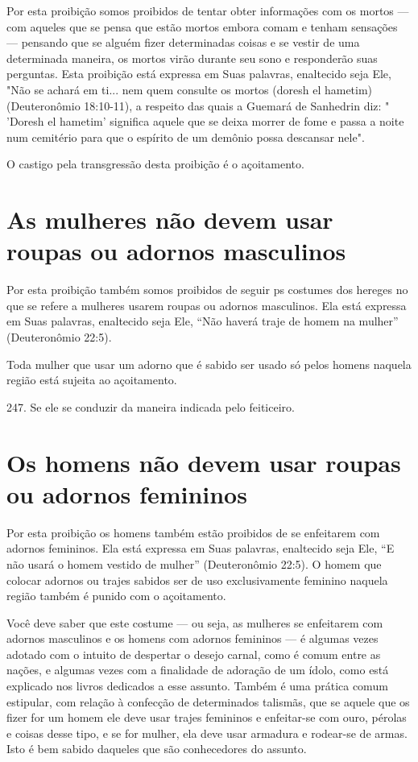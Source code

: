 Por esta proibição somos proibidos de tentar obter informações com os
mortos --- com aqueles que se pensa que estão mortos embora comam e
te­nham sensações --- pensando que se alguém fizer determinadas coisas e
se vestir de uma determinada maneira, os mortos virão durante seu sono e
responderão suas perguntas. Esta proibição está expressa em Suas
palavras, enaltecido seja Ele, "Não se achará em ti... nem quem consulte
os mortos (doresh el hametim) (Deuteronômio 18:10-11), a respeito das
quais a Guemará de Sanhedrin diz: " 'Do­resh el hametim' significa
aquele que se deixa morrer de fome e passa a noite num cemitério para
que o espírito de um demônio possa descansar nele".

O castigo pela transgressão desta proibição é o açoitamento.


\section{As mulheres não devem usar roupas ou adornos masculinos}


Por esta proibição também somos proibidos de seguir ps costumes dos
hereges no que se refere a mulheres usarem roupas ou adornos
masculi­nos. Ela está expressa em Suas palavras, enaltecido seja Ele,
``Não haverá traje de homem na mulher'' (Deuteronômio 22:5).

Toda mulher que usar um adorno que é sabido ser usado só pelos homens
naquela região está sujeita ao açoitamento.

247. Se ele se conduzir da maneira indicada pelo feiticeiro.


\section{Os homens não devem usar roupas ou adornos femininos}

Por esta proibição os homens também estão proibidos de se enfeita­rem
com adornos femininos. Ela está expressa em Suas palavras, enaltecido
se­ja Ele, ``E não usará o homem vestido de mulher'' (Deuteronômio 22:5).
O ho­mem que colocar adornos ou trajes sabidos ser de uso exclusivamente
femini­no naquela região também é punido com o açoitamento.

Você deve saber que este costume --- ou seja, as mulheres se enfeita­rem
com adornos masculinos e os homens com adornos femininos --- é algu­mas
vezes adotado com o intuito de despertar o desejo carnal, como é comum
entre as nações, e algumas vezes com a finalidade de adoração de um
ídolo, como está explicado nos livros dedicados a esse assunto. Também é
uma práti­ca comum estipular, com relação à confecção de determinados
talismãs, que se aquele que os fizer for um homem ele deve usar trajes
femininos e enfeitar-se com ouro, pérolas e coisas desse tipo, e se for
mulher, ela deve usar armadu­ra e rodear-se de armas. Isto é bem sabido
daqueles que são conhecedores do assunto.

